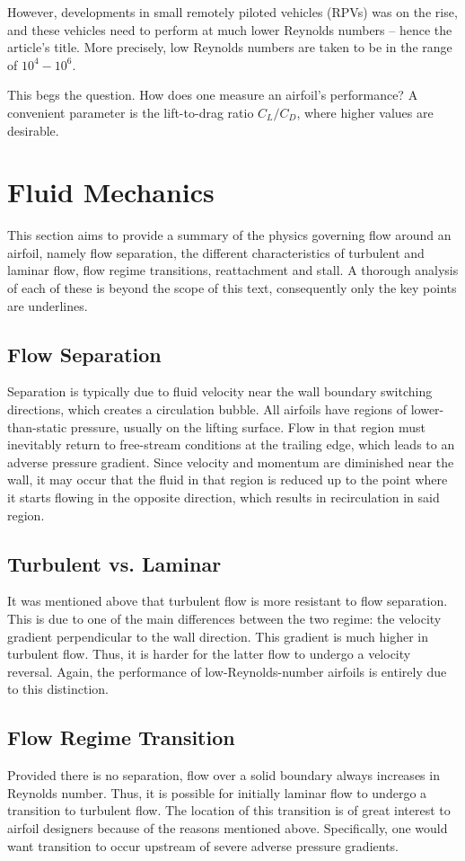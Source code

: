 However, developments in small remotely piloted vehicles (RPVs) was on the rise, and these vehicles
need to perform at much lower Reynolds numbers -- hence the article's title. More precisely, low Reynolds
numbers are taken to be in the range of $10^4 - 10^6$.

This begs the question. How does one measure an airfoil's performance? A convenient parameter is the
lift-to-drag ratio $C_L/C_D$, where higher values are desirable.

\section{Fluid Mechanics}
\label{sec:fluidmechanics}
This section aims to provide a summary of the physics governing flow around an airfoil,
namely flow separation, the different characteristics of turbulent and laminar flow,
flow regime transitions, reattachment and stall.
A thorough analysis of each of these is beyond the scope of this text, consequently
only the key points are underlines.

\subsection{Flow Separation}
Separation is typically due to fluid velocity near the wall boundary switching directions, which creates
a circulation bubble.  All airfoils have regions of lower-than-static pressure, usually on the lifting surface.
Flow in that region must inevitably return to free-stream conditions at the trailing edge, which leads
to an adverse pressure gradient. Since velocity and momentum are diminished near the wall, it may occur
that the fluid in that region is reduced up to the point where it starts flowing in the opposite direction,
which results in recirculation in said region.

\subsection{Turbulent vs. Laminar}
It was mentioned above that turbulent flow is more resistant to flow separation. This is due to one of the main
differences between the two regime: the velocity gradient perpendicular to the wall direction. This gradient is
much higher in turbulent flow. Thus, it is harder for the latter flow to undergo a velocity reversal. Again,
the performance of low-Reynolds-number airfoils is entirely due to this distinction.

\subsection{Flow Regime Transition}
Provided there is no separation, flow over a solid boundary always increases in Reynolds number. Thus, it is
possible for initially laminar flow to undergo a transition to turbulent flow. The location of this transition
is of great interest to airfoil designers because of the reasons mentioned above. Specifically, one would
want transition to occur upstream of severe adverse pressure gradients.

